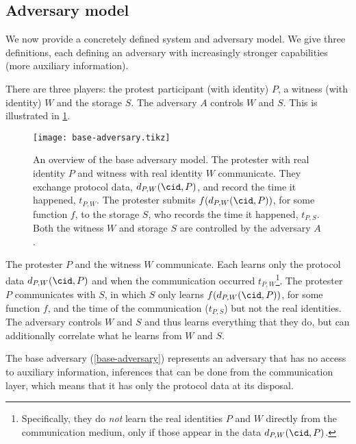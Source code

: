 \subsection{Adversary model}%
\label{formal-adversary-model}

We now provide a concretely defined system and adversary model.
We give three definitions, each defining an adversary with increasingly stronger 
capabilities (\ie more auxiliary information).

There are three players: the protest participant (with identity) \(P\), a 
witness (with identity) \(W\) and the storage \(S\).
The adversary \(A\) controls \(W\) and \(S\).
This is illustrated in \cref{fig:base-adversary}.

\begin{figure}
  \centering
  \texttt{[image: base-adversary.tikz]}
  \caption{\label{fig:base-adversary}%
    An overview of the base adversary model.
    The protester with real identity \(P\) and witness with real identity \(W\) 
    communicate.
    They exchange protocol data, \(d_{P,W}(\cid, P)\), and record the time it 
    happened, \(t_{P,W}\).
    The protester submits \(f(d_{P,W}(\cid, P))\), for some function \(f\), to 
    the storage \(S\), who records the time it happened, \(t_{P,S}\).
    Both the witness \(W\) and storage \(S\) are controlled by the adversary 
    \(A\).
  }
\end{figure}

\begin{definition}%
  \label{base-adversary}
  The protester \(P\) and the witness \(W\) communicate.
  Each learns only the protocol data \(d_{P,W}(\cid, P)\) and when the 
  communication occurred \(t_{P,W}\)\footnote{%
    Specifically, they do \emph{not} learn the real identities \(P\) and \(W\) 
    directly from the communication medium, only if those appear in the data 
    \(d_{P,W}(\cid, P)\).
  }.
  The protester \(P\) communicates with \(S\), in which \(S\) only learns 
  \(f(d_{P,W}(\cid, P))\), for some function \(f\), and the time of the 
  communication (\(t_{P,S}\)) but not the real identities.
  The adversary controls \(W\) and \(S\) and thus learns everything that they 
  do, but can additionally correlate what he learns from \(W\) and \(S\).
\end{definition}

The base adversary (\cref{base-adversary}) represents an adversary that has no 
access to auxiliary information, \eg inferences that can be done from the 
communication layer, which means that it has only the protocol data at its 
disposal.

